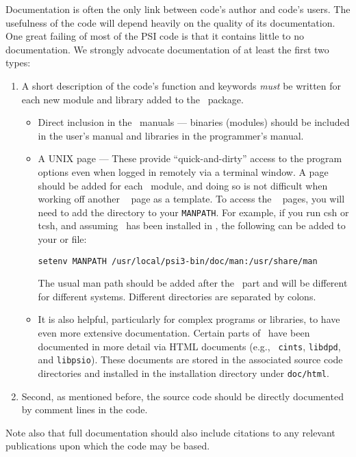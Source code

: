Documentation is often the only link between code's author and code's
users. The usefulness of the code will depend heavily on the quality
of its documentation.  One great failing of most of the PSI code is
that it contains little to no documentation.  We strongly advocate
documentation of at least the first two types:
\begin{enumerate}
\item A short description of the code's function and keywords {\em must} be 
written for each new module and library added to the \PSIthree\ package.
\begin{itemize}
\item Direct inclusion in the \PSIthree\ manuals --- binaries
(modules) should be included in the user's manual and libraries in the
programmer's manual.
\item A UNIX  page --- These provide ``quick-and-dirty'' access
to the program options even when logged in remotely via a terminal window.
A  page should be added for each \PSIthree\ module, and doing so 
is not difficult when working off another \PSIthree\  page as a
template.  To access the 
\PSIthree\  pages, you will need to add the  directory
to your {\tt MANPATH}.  For example, if you run csh or tcsh, and
assuming \PSIthree\ has been installed in ,
the following can be added to your  or  file:
\begin{verbatim}
setenv MANPATH /usr/local/psi3-bin/doc/man:/usr/share/man
\end{verbatim}
The usual man path should be added after the \PSIthree\ part and
will be different for different systems.  Different directories are
separated by colons.
\item It is also helpful, particularly for complex programs or libraries,
to have even more extensive documentation.  Certain parts of \PSIthree\
have been documented in more detail via HTML documents (e.g., {\tt
cints}, {\tt libdpd}, and {\tt libpsio}).  These documents are stored
in the associated source code directories and installed in the installation 
directory under {\tt doc/html}.
\end{itemize}

\item Second, as mentioned before, the source code should be directly
documented by comment lines in the code.

\end{enumerate}

Note also that full documentation should also include citations to any
relevant publications upon which the code may be based.


